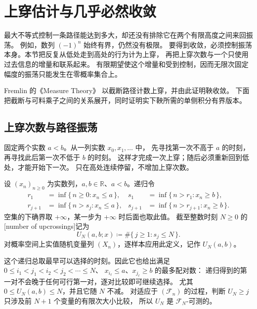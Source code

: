 \section{上穿估计与几乎必然收敛}
\label{b1:sec:3105}

最大不等式控制一条路径能达到多大，却还没有排除它在两个有限高度之间来回振荡。
例如，数列 \((-1)^n\) 始终有界，仍然没有极限。
要得到收敛，必须控制振荡本身。本节把反复从低处走到高处的行为计为上穿，
再把上穿次数与一个只使用过去信息的增量和联系起来。
有限期望使这个增量和受到控制，因而无限次固定幅度的振荡只能发生在零概率集合上。

\ProseParagraphBreak

Fremlin 的《Measure Theory》\cite[275E--275G]{Fremlin2016Measure}
以截断路径计数上穿，并由此证明鞅收敛。
下面把截断与可料乘子之间的关系展开，同时证明实下鞅所需的单侧积分有界版本。

\subsection{上穿次数与路径振荡}
\label{b1:subsec:310501}

固定两个实数 \(a<b\)。从一列实数 \(x_0,x_1,\ldots\) 中，
先寻找第一次不高于 \(a\) 的时刻，再寻找此后第一次不低于 \(b\) 的时刻。
这样才完成一次上穿；随后必须重新回到低处，才能开始下一次。
只在高处连续停留，不增加上穿次数。

\begin{definition}[上穿次数]
\label{b1:def:upcrossing-31}
设 \((x_n)_{n\geq0}\) 为实数列，\(a,b\in\mathbb R\)、\(a<b\)。递归令
\[
 \begin{aligned}
 r_1&=\inf\{\,n\geq0:x_n\leq a\,\},&
 s_1&=\inf\{\,n>r_1:x_n\geq b\,\},\\
 r_{j+1}&=\inf\{\,n>s_j:x_n\leq a\,\},&
 s_{j+1}&=\inf\{\,n>r_{j+1}:x_n\geq b\,\}.
 \end{aligned}
\]
空集的下确界取 \(+\infty\)，某一步为 \(+\infty\) 时后面也取此值。
截至整数时刻 \(N\geq0\) 的[number of upcrossings]记为
\[
 U_N(a,b;x)\coloneqq\#\{\,j\geq1:s_j\leq N\,\}.
\]
对概率空间上实值随机变量列 \((X_n)\)，逐样本应用此定义，记作
\(U_N(a,b)\)。
\end{definition}

这个递归总取最早可以选择的时刻。因此它也给出满足
\(0\leq i_1<j_1<i_2<j_2<\cdots\leq N\)、
\(x_{i_\ell}\leq a\)、\(x_{j_\ell}\geq b\) 的最多配对数：
递归得到的第一对不会晚于任何可行第一对，逐对比较即可继续选择。
尤其 \(0\leq U_N(a,b)\leq N\)，并且它随 \(N\) 不减。
对适应于 \((\mathcal F_n)\) 的过程，判断 \(U_N\geq j\) 只涉及前 \(N+1\) 个变量的有限次大小比较，
所以 \(U_N\) 是 \(\mathcal F_N\)-可测的。

